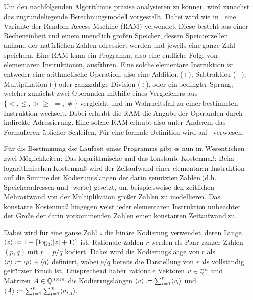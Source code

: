 Um den nachfolgenden Algorithmus präzise analysieren zu können, wird zunächst das zugrundeliegende Berechnungsmodell vorgestellt.
Dabei wird wie in~\cite{Gritzmann2013} eine Variante der Random-Access-Machine (RAM) verwendet.
Diese besteht aus einer Recheneinheit und einem unendlich großen Speicher, dessen Speicherzellen anhand der natürlichen Zahlen adressiert werden und jeweils eine ganze Zahl speichern.
Eine RAM kann ein Programm, also eine endliche Folge von elementaren Instruktionen, ausführen.
Eine solche elementare Instruktion ist entweder eine arithmetische Operation, also eine Addition ($+$), Subtraktion ($-$), Multiplikation ($\cdot$) oder ganzzahlige Division ($\div$), oder ein bedingter Sprung, welcher zunächst zwei Operanden mithilfe eines Vergleichers aus $\{ <, \leq, > \geq, =, \neq \}$ vergleicht und im Wahrheitsfall zu einer bestimmten Instruktion wechselt.
Dabei erlaubt die RAM die Angabe der Operanden durch indirekte Adressierung.
Eine solche RAM erlaubt also unter Anderem das Formulieren üblicher Schleifen.
Für eine formale Definition wird auf~\cite{Gritzmann2013} verwiesen.

Für die Bestimmung der Laufzeit eines Programms gibt es nun im Wesentlichen zwei Möglichkeiten:
Das logarithmische und das konstante Kostenmaß:
Beim logarithmischen Kostenmaß wird der Zeitaufwand einer elementaren Instruktion auf die Summe der Kodierungslängen der darin genutzten Zahlen (d.h. Speicheradressen und -werte) gesetzt, um beispielsweise den zeitlichen Mehraufwand von der Multiplikation großer Zahlen zu modellieren.
Das konstante Kostenmaß hingegen weist jeder elementaren Instruktion unbeachtet der Größe der darin vorkommenden Zahlen einen konstanten Zeitaufwand zu.

Dabei wird für eine ganze Zahl $z$ die binäre Kodierung verwendet, deren Länge $\langle z\rangle \coloneq 1 + \lceil \log_2(\lvert z\rvert+1) \rceil$ ist.
Rationale Zahlen $r$ werden als Paar ganzer Zahlen $(p,q)$ mit $r = p/q$ kodiert.
Dabei wird die Kodierungslänge von $r$ als $\langle r\rangle\coloneq \langle p\rangle + \langle q\rangle$ definiert, wobei $p/q$ bereits die Darstellung von $r$ als vollständig gekürzter Bruch ist.
Entsprechend haben rationale Vektoren $v\in\mathbb{Q}^n$ und Matrizen $A\in\mathbb{Q}^{n\times m}$ die Kodierungslängen $\langle v\rangle \coloneq \sum_{i=1}^n \langle v_i\rangle$ und $\langle A\rangle\coloneq \sum_{i=1}^n\sum_{j=1}^m \langle a_{i,j}\rangle$.

